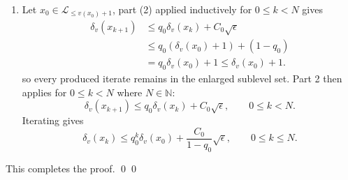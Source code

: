 \documentclass[smallextended]{svjour3}
\let\springerproof\proof
\let\endspringerproof\endproof
\renewenvironment{proof}{\springerproof}{%
  \ifhmode\qed\else\leavevmode\qed\fi\endspringerproof}
\newcommand{\N}{\mathbb{N}}
\begin{document}
\begin{proof}
\begin{enumerate}
        \item Let $x_0\in\mathcal{L}_{\leq v(x_0)+1}$, part (2)
        applied inductively for $0\leq k<N$ gives
        \begin{align*}
            \delta_v(x_{k+1}) &\le q_0\delta_v(x_k)+C_0\sqrt{\epsilon} \\
            &\le q_0(\delta_v(x_0)+1)+(1-q_0) \\
            &=q_0\delta_v(x_0)+1
            \le\delta_v(x_0)+1.
        \end{align*}
        so every produced iterate remains in the enlarged sublevel set. Part
        2 then applies for $0\leq k<N$ where $N\in \N$: 
        \[
            \delta_v(x_{k+1})
            \le
            q_0\delta_v(x_k)+C_0\sqrt{\epsilon}, \qquad 0\leq k<N.
        \]
        Iterating gives
        \[
            \delta_v(x_k)
            \le
            q_0^k\delta_v(x_0)+\frac{C_0}{1-q_0}\sqrt{\epsilon},
            \qquad 0\leq k\leq N.
        \]
    \end{enumerate}
    This completes the proof. 
\end{proof}
\end{document}
